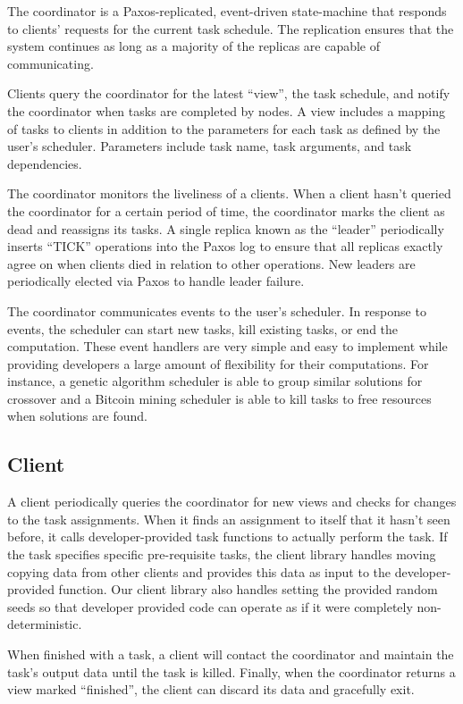 \documentclass [11pt, twocolumn] {article}
\begin{document}
The coordinator is a Paxos-replicated, event-driven state-machine that responds to clients' requests for the current task schedule. The replication ensures that the system continues as long as a majority of the replicas are capable of communicating. 

Clients query the coordinator for the latest ``view'', the task schedule, and notify the coordinator when tasks are completed by nodes. A view includes a mapping of tasks to clients in addition to the parameters for each task as defined by the user's scheduler. Parameters include task name, task arguments, and task dependencies. 

The coordinator monitors the liveliness of a clients. When a client hasn't queried the coordinator for a certain period of time, the coordinator marks the client as dead and reassigns its tasks. A single replica known as the ``leader'' periodically inserts ``TICK'' operations into the Paxos log to ensure that all replicas exactly agree on when clients died in relation to other operations. New leaders are periodically elected via Paxos to handle leader failure.

The coordinator communicates events to the user's scheduler. In response to events, the scheduler can start new tasks, kill existing tasks, or end the computation. These event handlers are very simple and easy to implement while providing developers a large amount of flexibility for their computations. For instance, a genetic algorithm scheduler is able to group similar solutions for crossover and a Bitcoin mining scheduler is able to kill tasks to free resources when solutions are found.

\subsection {Client} 

A client periodically queries the coordinator for new views and checks for changes to the task assignments. When it finds an assignment to itself that it hasn't seen before, it calls developer-provided task functions to actually perform the task. If the task specifies specific pre-requisite tasks, the client library handles moving copying data from other clients and provides this data as input to the developer-provided function. Our client library also handles setting the provided random seeds so that developer provided code can operate as if it were completely non-deterministic. 

When finished with a task, a client will contact the coordinator and maintain the task's output data until the task is killed. Finally, when the coordinator returns a view marked ``finished'', the client can discard its data and gracefully exit. 
\end{document}
